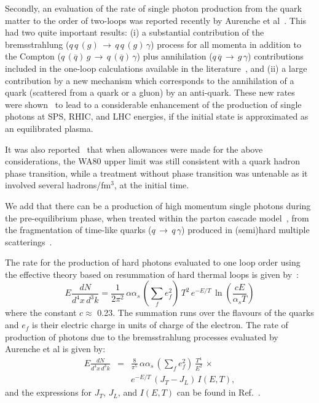Secondly, an evaluation of the rate of single photon production from the
quark matter to the order of two-loops was reported recently
by Aurenche et al~\cite{pat,MT}. This had two quite important results:
 (i) a substantial contribution of the bremsstrahlung
($q\,q\,(g)\,\rightarrow\,q\,q\,(g)\,\gamma$) process 
for all momenta in addition to the Compton 
($q\,(\overline{q})\,g\,\rightarrow\,q\,(\overline{q})\,\gamma$) plus
 annihilation ($q\,\overline{q}\,\rightarrow\,g\,\gamma$)
contributions included in the one-loop calculations available in the
literature~\cite{joe,rolf}, and (ii) a large contribution by a new mechanism
which corresponds to the annihilation of a quark (scattered from a
quark or a gluon) by an anti-quark.
These new rates were shown~\cite{zpc2} to  lead to  a considerable
 enhancement of the
production of single photons at SPS, RHIC, and LHC energies,
if the initial state is approximated as an equilibrated plasma.

It was also reported~\cite{zpc1} that when allowances were made for the above
considerations, the WA80 upper limit was still consistent with a quark
hadron phase transition, while a treatment without phase transition
 was untenable as it involved several hadrons/fm$^3$, at the initial time.

We add that there can be a production of high momentum
single photons during the pre-equilibrium phase, when treated within the
parton cascade model~\cite{pcm}, from the fragmentation of time-like 
quarks ($q\,\rightarrow\,q\,\gamma$) produced
in (semi)hard multiple scatterings~\cite{pcmphot}.


The rate for the production of hard photons evaluated to one
loop order using the effective theory based on resummation of
hard thermal loops is given by~\cite{joe,rolf}:
\begin{equation}
E\frac{dN}{d^4x\,d^3k}=\frac{1}{2\pi^2}\,\alpha\alpha_s\,
                          \left(\sum_f e_f^2\right)\, T^2\,
                       e^{-E/T}\,\ln(\frac {cE}{\alpha_s T})
\end{equation}
where the constant $c\approx$ 0.23.  The summation runs over
the flavours of the quarks and $e_f$ is their electric charge 
in units of charge of the electron. The rate of production
of photons due to the bremsstrahlung processes evaluated by
Aurenche et al is given by:
\begin{eqnarray}
E\frac{dN}{d^4x\,d^3k}&=&\frac{8}{\pi^5}\,\alpha\alpha_s\,
                          \left(\sum_f e_f^2\right)\, 
                        \frac{T^4}{E^2}\,\times \nonumber\\
                       & &e^{-E/T}\,(J_T-J_L)\,I(E,T),
\end{eqnarray}
and the expressions for $J_T$, $J_L$, and $I(E,T)$ can be found 
in Ref.~\cite{pat}.

